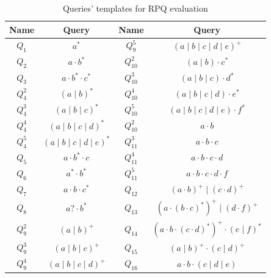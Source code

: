 \begin{table}
{\small
\renewcommand{\arraystretch}{1.25}
\begin{tabular}{|c|c||c|c|}
\hline

Name & Query & Name & Query \\
\hline
\hline 
$Q_1$   & $a^*$                               & $Q_9^5$  & $(a \mid b \mid c \mid d \mid e)^+$                     \\
$Q_2$   & $a\cdot b^*$                        & $Q_{10}^2$ & $(a \mid b) \cdot c^*$                                  \\
$Q_3$   & $a \cdot b^* \cdot c^*$             & $Q_{10}^3$ & $(a \mid b \mid c)  \cdot d^*$                          \\
$Q_4^2$ & $(a \mid b)^*$                      & $Q_{10}^4$ & $(a \mid b \mid c \mid d)  \cdot e^*$                   \\
$Q_4^3$ & $(a \mid b \mid c)^*$               & $Q_{10}^5$ & $(a \mid b \mid c \mid d \mid e)  \cdot f^*$            \\
$Q_4^4$ & $(a \mid b \mid c \mid d)^*$        & $Q_{10}^2$ & $a \cdot b$                                             \\
$Q_4^5$ & $(a \mid b \mid c \mid d \mid e)^*$ & $Q_{11}^3$ & $a \cdot b \cdot c$                                     \\
$Q_5$   & $a \cdot b^* \cdot c$               & $Q_{11}^4$ & $a \cdot b \cdot c \cdot d$                             \\
$Q_6$   & $a^* \cdot b^*$                     & $Q_{11}^5$ & $a \cdot b \cdot c \cdot d \cdot f$                     \\
$Q_7$   & $a \cdot b \cdot c^*$               & $Q_{12}$   & $(a \cdot b)^+ \mid  (c \cdot d)^+$                     \\
$Q_8$   & $a? \cdot b^*$                      & $Q_{13}$   & $(a \cdot(b \cdot c)^*)^+ \mid  (d \cdot f)^+$          \\
$Q_9^2$ & $(a \mid b)^+$                      & $Q_{14}$   & $(a \cdot b \cdot (c \cdot d)^*)^+  \cdot (e \mid f)^*$ \\
$Q_9^3$ & $(a \mid b \mid c)^+$               & $Q_{15}$   & $(a \mid b)^+ \cdot (c \mid d)^+$                       \\
$Q_9^4$ & $(a \mid b \mid c \mid d)^+$        & $Q_{16}$   & $a \cdot b \cdot (c \mid d \mid e)$                     \\
\hline
\end{tabular}
}
\caption{Queries' templates for RPQ evaluation}
\label{tbl:queries_templates}
\end{table}


